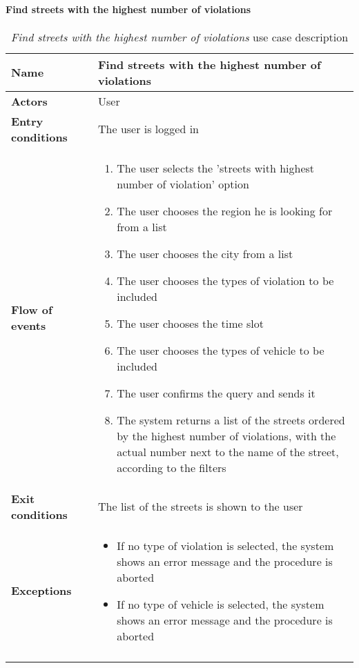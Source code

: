 		\paragraph{Find streets with the highest number of violations}
		\begin{longtable}{p{0.25\linewidth}p{0.75\linewidth}}
			\toprule
			\textbf{Name} & \textbf{Find streets with the highest number of violations} \\
			\midrule
			\textbf{Actors} & User \\
			\midrule
			\textbf{Entry conditions} & The user is logged in \\
			\midrule
			\textbf{Flow of events} & 
			\begin{enumerate}
				\item The user selects the 'streets with highest number of violation' option
				\item The user chooses the region he is looking for from a list
				\item The user chooses the city from a list
				\item The user chooses the types of violation to be included
				\item The user chooses the time slot
				\item The user chooses the types of vehicle to be included
				\item The user confirms the query and sends it
				\item The system returns a list of the streets ordered by the highest number of violations, with the actual number next to the name of the street, according to the filters
			\end{enumerate} \\
			\midrule
			\textbf{Exit conditions} & The list of the streets is shown to the user \\
			\midrule
			\textbf{Exceptions} & 
			\begin{itemize}
				\item 	If no type of violation is selected, the system shows an error message and the procedure is aborted
				\item If no type of vehicle is selected, the system shows an error message and the procedure is aborted	
			\end{itemize} \\
			\bottomrule
			\caption{\emph{Find streets with the highest number of violations} use case description}
		\end{longtable}
		
